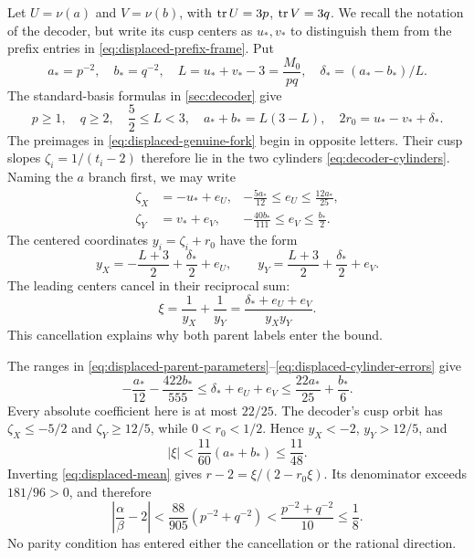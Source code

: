 Let $U=\nu(a)$ and $V=\nu(b)$, with $\operatorname{tr} U=3p$, $\operatorname{tr} V=3q$. We recall the notation of the decoder, but write its cusp centers as $u_*,v_*$ to distinguish them from the prefix entries in \eqref{eq:displaced-prefix-frame}. Put
$$
 a_*=p^{-2},\quad b_*=q^{-2},\quad
 L=u_*+v_*-3=\frac{M_0}{pq},\quad
 \delta_*=(a_*-b_*)/L.
$$
The standard-basis formulas in \cref{sec:decoder} give
\begin{equation}
 p\geqslant1,\quad q\geqslant2,\quad
 \frac52\leqslant L<3,\quad
 a_*+b_*=L(3-L),\quad 2r_0=u_*-v_*+\delta_*.
 \label{eq:displaced-parent-parameters}
\end{equation}
The preimages in \eqref{eq:displaced-genuine-fork} begin in opposite letters. Their cusp slopes $\zeta_i=1/(t_i-2)$ therefore lie in the two cylinders \eqref{eq:decoder-cylinders}. Naming the $a$ branch first, we may write
\begin{align}
 \zeta_X&=-u_*+e_U,&-\frac{5a_*}{12}\leqslant e_U\leqslant\frac{12a_*}{25},\nonumber\\
 \zeta_Y&=v_*+e_V,&-\frac{40b_*}{111}\leqslant e_V\leqslant\frac{b_*}{2}.
 \label{eq:displaced-cylinder-errors}
\end{align}
The centered coordinates $y_i=\zeta_i+r_0$ have the form
$$
 y_X=-\frac{L+3}{2}+\frac{\delta_*}{2}+e_U,
 \qquad y_Y=\frac{L+3}{2}+\frac{\delta_*}{2}+e_V.
$$
The leading centers cancel in their reciprocal sum:
\begin{equation}
 \xi=\frac1{y_X}+\frac1{y_Y}
 =\frac{\delta_*+e_U+e_V}{y_Xy_Y}.
 \label{eq:displaced-parent-cancellation}
\end{equation}
This cancellation explains why both parent labels enter the bound.

The ranges in \eqref{eq:displaced-parent-parameters}--\eqref{eq:displaced-cylinder-errors} give
$$
 -\frac{a_*}{12}-\frac{422b_*}{555}
 \leqslant\delta_*+e_U+e_V
 \leqslant\frac{22a_*}{25}+\frac{b_*}{6}.
$$
Every absolute coefficient here is at most $22/25$. The decoder's cusp orbit has $\zeta_X\leqslant-5/2$ and $\zeta_Y\geqslant12/5$, while $0<r_0<1/2$. Hence $y_X<-2$, $y_Y>12/5$, and
$$
 |\xi|<\frac{11}{60}(a_*+b_*)\leqslant\frac{11}{48}.
$$
Inverting \eqref{eq:displaced-mean} gives $r-2=\xi/(2-r_0\xi)$. Its denominator exceeds $181/96>0$, and therefore
\begin{equation}
 \left|\frac\alpha\beta-2\right|
 <\frac{88}{905}(p^{-2}+q^{-2})
 <\frac{p^{-2}+q^{-2}}{10}\leqslant\frac18.
 \label{eq:displaced-parent-cone}
\end{equation}
No parity condition has entered either the cancellation or the rational direction.

